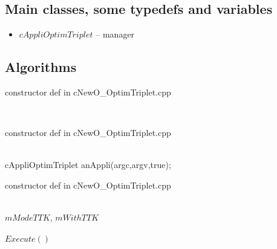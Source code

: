 \subsection{Main classes, some typedefs and variables}

\begin{itemize}
\item $cAppliOptimTriplet$ -- manager
\end{itemize}

\subsection{Algorithms}


\begin{algorithm}
\caption{ constructor def in cNewO\_OptimTriplet.cpp  }
\begin{algorithmic}
\State 
\\
\Comment {}
 
\end{algorithmic}\label{alg:Optim1Main}
\end{algorithm}

\begin{algorithm}
\caption{ constructor def in cNewO\_OptimTriplet.cpp  }
\begin{algorithmic}
\State 
\\
\Comment {}
 \State cAppliOptimTriplet anAppli(argc,argv,true);

\end{algorithmic}\label{alg:Optim1OneIm}
\end{algorithm}

 
\begin{algorithm}
\caption{ constructor def in cNewO\_OptimTriplet.cpp  }
\begin{algorithmic}
\State 
\\
\Comment {}
 \State  $mModeTTK$,  $mWithTTK$
 \\
 \\
\Comment {}
\State $Execute()$
\\
\end{algorithmic}\label{alg:Optim1AppliOneIm}
\end{algorithm}


